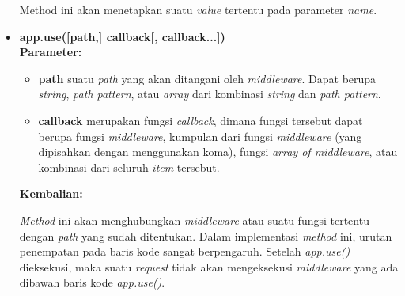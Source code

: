 \begin{itemize}
	Method ini akan menetapkan suatu \textit{value} tertentu pada parameter \textit{name}.

	\item \textbf{app.use([path,] callback[, callback...])} \\ 
	\textbf{Parameter:} 
	\begin{itemize}
		\item \textbf{path} suatu \textit{path} yang akan ditangani oleh \textit{middleware}. Dapat berupa \textit{string}, \textit{path pattern}, atau \textit{array} dari kombinasi \textit{string} dan \textit{path pattern}.
		
		\item \textbf{callback} merupakan fungsi \textit{callback}, dimana fungsi tersebut dapat berupa fungsi \textit{middleware}, kumpulan dari fungsi \textit{middleware} (yang dipisahkan dengan menggunakan koma), fungsi \textit{array of middleware}, atau kombinasi dari seluruh \textit{item} tersebut.
	\end{itemize}
	\textbf{Kembalian:} -
	
	\textit{Method} ini akan menghubungkan \textit{middleware} atau suatu fungsi tertentu dengan \textit{path} yang sudah ditentukan. Dalam implementasi \textit{method} ini, urutan penempatan pada baris kode sangat berpengaruh. Setelah \textit{app.use()} dieksekusi, maka suatu \textit{request} tidak akan mengeksekusi \textit{middleware} yang ada dibawah baris kode \textit{app.use()}. 
	
%	

%	
	

\end{itemize}
